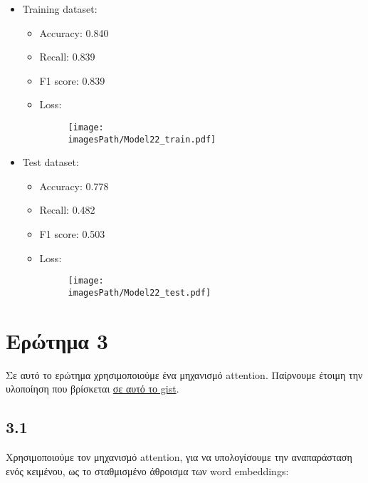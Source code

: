\documentclass[a4paper, 12pt]{article}
\newcommand{\imagesPath}{results}
\newcommand{\myWidth}{0.8\linewidth}
\begin{document}
        \begin{itemize}
            \item Training dataset:
                \begin{itemize}
                    \item Accuracy: 0.840 
                    \item Recall: 0.839 
                    \item F1 score: 0.839 
                    \item Loss:
                        \begin{figure}[H]
                            \centering
                            \texttt{[image: \\imagesPath/Model22\_train.pdf]}
                        \end{figure}
                \end{itemize}
                
            \item Test dataset:
                \begin{itemize}
                    \item Accuracy: 0.778 
                    \item Recall: 0.482 
                    \item F1 score: 0.503 
                    \item Loss:
                        \begin{figure}[H]
                            \centering
                            \texttt{[image: \\imagesPath/Model22\_test.pdf]}
                        \end{figure}
                \end{itemize}
        \end{itemize}

\section*{Ερώτημα 3}
    
    Σε αυτό το ερώτημα χρησιμοποιούμε ένα μηχανισμό attention. Παίρνουμε έτοιμη την υλοποίηση που βρίσκεται \href{https://gist.github.com/cbaziotis/94e53bdd6e4852756e0395560ff38aa4}{σε αυτό το gist}.

    \subsection*{3.1}

        Χρησιμοποιούμε τον μηχανισμό attention, για να υπολογίσουμε την αναπαράσταση ενός κειμένου, ως το σταθμισμένο άθροισμα των word embeddings:
        
\end{document}
